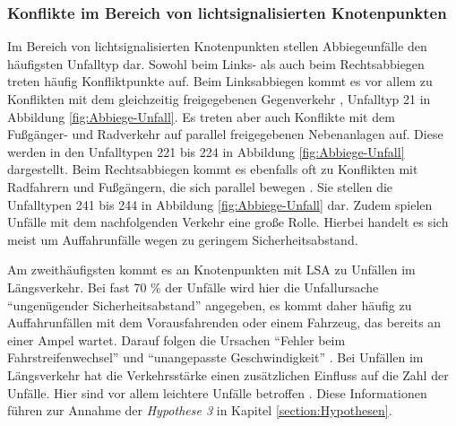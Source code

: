 \subsubsection{Konflikte im Bereich von lichtsignalisierten Knotenpunkten}\label{chapter:Knotenpunkte mit LSA}

Im Bereich von lichtsignalisierten Knotenpunkten stellen Abbiegeunfälle den häufigsten Unfalltyp dar. Sowohl beim Links- als auch beim Rechtsabbiegen treten häufig Konfliktpunkte auf. Beim Linksabbiegen kommt es vor allem zu Konflikten mit dem gleichzeitig freigegebenen Gegenverkehr \parencite[S. 273]{Schreiber.2016}, Unfalltyp 21 in Abbildung \ref{fig:Abbiege-Unfall}. Es treten aber auch Konflikte mit dem Fußgänger- und Radverkehr auf parallel freigegebenen Nebenanlagen auf. Diese werden in den Unfalltypen 221 bis 224 in Abbildung \ref{fig:Abbiege-Unfall} dargestellt. Beim Rechtsabbiegen kommt es ebenfalls oft zu Konflikten mit Radfahrern und Fußgängern, die sich parallel bewegen \parencite[S. 273]{Schreiber.2016}. Sie stellen die Unfalltypen 241 bis 244 in Abbildung \ref{fig:Abbiege-Unfall} dar. Zudem spielen Unfälle mit dem nachfolgenden Verkehr eine große Rolle. Hierbei handelt es sich meist um Auffahrunfälle wegen zu geringem Sicherheitsabstand.

Am zweithäufigsten kommt es an Knotenpunkten mit \ac{LSA} zu Unfällen im Längsverkehr. Bei fast 70 \% der Unfälle wird hier die Unfallursache \enquote{ungenügender Sicherheitsabstand} angegeben, es kommt daher häufig zu Auffahrunfällen mit dem Vorausfahrenden oder einem Fahrzeug, das bereits an einer Ampel wartet. Darauf folgen die Ursachen \enquote{Fehler beim Fahrstreifenwechsel} und \enquote{unangepasste Geschwindigkeit} \parencite[S. 273]{Schreiber.2016}. Bei Unfällen im Längsverkehr hat die Verkehrsstärke einen zusätzlichen Einfluss auf die Zahl der Unfälle. Hier sind vor allem leichtere Unfälle betroffen \parencite[S. 86]{Aurich.2015}. Diese Informationen führen zur Annahme der \textit{Hypothese 3} in Kapitel \ref{section:Hypothesen}.

